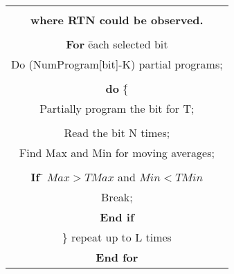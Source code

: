 
\begin{center}

\begin{tabular}{|c|}
\hline
\begin{minipage}[t]{3.2in}



\begin{tabbing}
{\bf Algorithm III  Program selected bits to proper levels }
\\ {\bf where RTN could be observed. }
\\
\\ {\bf For} \= each selected bit
\\ \> Do (NumProgram[bit]-K) partial programs;
\\
\\ \> {\bf do} \= \{
\\ \>\>  Partially program the bit for T;
\\
\\ \>\>  Read the bit N times;
\\ \>\>  Find Max and Min for moving averages;
\\
\\ \>\> {\bf If} \= $Max > TMax$ and $Min < TMin$ 
\\ \>\>\>    Break;
\\ \>\> {\bf End if}
\\ \> \} repeat up to L times
\\ {\bf End for}


\end{tabbing}
\end{minipage}
\\ \hline
\end{tabular}
\end{center}
